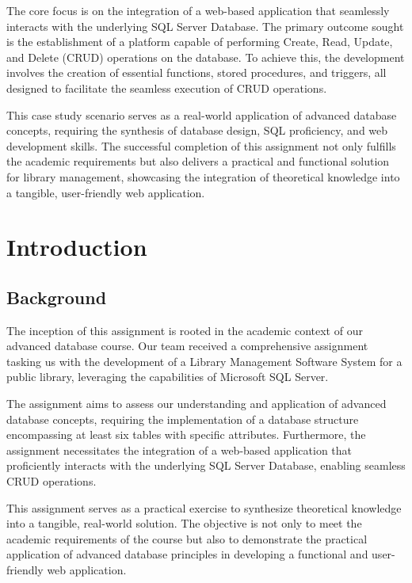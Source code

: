 \documentclass[12pt,titlepage,a4paper]{report}
\begin{document}
The core focus is on the integration of a web-based application that seamlessly interacts with the underlying SQL Server Database. The primary outcome sought is the establishment of a platform capable of performing Create, Read, Update, and Delete (CRUD) operations on the database. To achieve this, the development involves the creation of essential functions, stored procedures, and triggers, all designed to facilitate the seamless execution of CRUD operations.

This case study scenario serves as a real-world application of advanced database concepts, requiring the synthesis of database design, SQL proficiency, and web development skills. The successful completion of this assignment not only fulfills the academic requirements but also delivers a practical and functional solution for library management, showcasing the integration of theoretical knowledge into a tangible, user-friendly web application.

\newpage

\tableofcontents

\newpage

\chapter{Introduction}
\section{Background}
The inception of this assignment is rooted in the academic context of our advanced database course. Our team received a comprehensive assignment tasking us with the development of a Library Management Software System for a public library, leveraging the capabilities of Microsoft SQL Server.

The assignment aims to assess our understanding and application of advanced database concepts, requiring the implementation of a database structure encompassing at least six tables with specific attributes. Furthermore, the assignment necessitates the integration of a web-based application that proficiently interacts with the underlying SQL Server Database, enabling seamless CRUD operations.

This assignment serves as a practical exercise to synthesize theoretical knowledge into a tangible, real-world solution. The objective is not only to meet the academic requirements of the course but also to demonstrate the practical application of advanced database principles in developing a functional and user-friendly web application.
\end{document}
